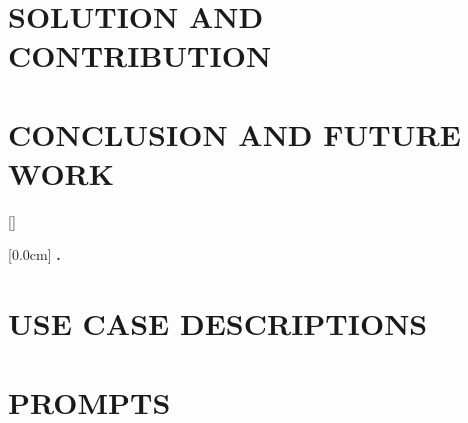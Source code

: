 \documentclass[a4paper,13pt,3p,twoside]{report}
\makeatletter
\renewcommand{\bibname}{reference}
\renewcommand{\figurename}{Figure}
\renewcommand{\tablename}{Table}
\renewcommand{\chaptername}{CHAPTER}
\theoremstyle{definition}
\DeclareRobustCommand{\_}{\textunderscore\penalty\z@\hspace{0pt}}
\makeatother
\begin{document}
\newpage
\chapter{SOLUTION AND CONTRIBUTION}
\label{chapter:SolutionAndContribution}

\newpage
\chapter{CONCLUSION AND FUTURE WORK} %
\label{chapter:conclusion}



\newpage
\renewcommand\bibname{REFERENCE}
\printbibliography
{}

\appendixpage
\appendices
\addappheadtotoc
\renewcommand{\figurename}{Figure}
\renewcommand{\tablename}{Table}
\renewcommand{\chaptername}{CHAPTER}


{}[]
\titlespacing*{\chapter}{0pt}{-20pt}{20pt}

    [0.0cm]             %
    {\bfseries\vspace{0.3cm}}                  %
    {{\bfseries{\scshape} \thecontentslabel.\ }} %
    {}         %
    {\contentspage}         %
\chapter{USE CASE DESCRIPTIONS}


\chapter{PROMPTS}

\end{document}
